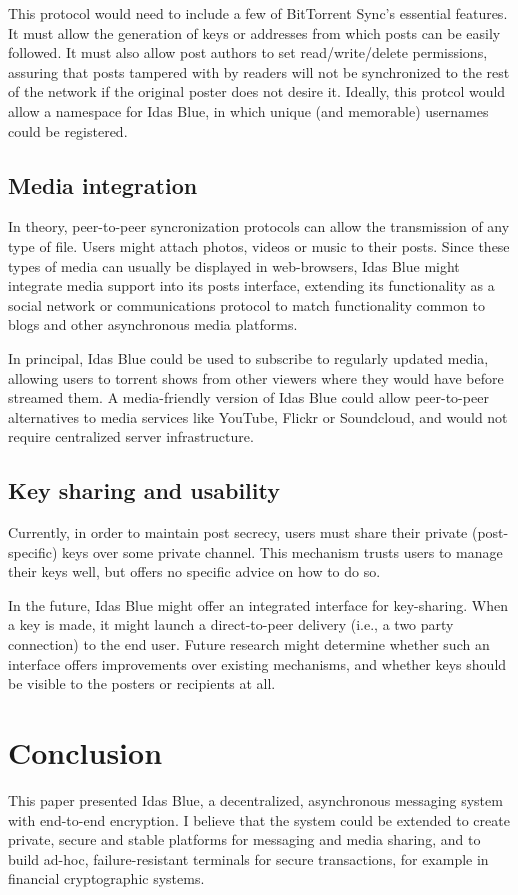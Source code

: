 \documentclass{article}
\begin{document}
This protocol would need to include a few of BitTorrent Sync's essential features. It must allow the generation of keys or addresses from which posts can be easily followed. It must also allow post authors to set read/write/delete permissions, assuring that posts tampered with by readers will not be synchronized to the rest of the network if the original poster does not desire it. Ideally, this protcol would allow a namespace for Idas Blue, in which unique (and memorable) usernames could be registered. 

\subsection{Media integration}
In theory, peer-to-peer syncronization protocols can allow the transmission of any type of file. Users might attach photos, videos or music to their posts. Since these types of media can usually be displayed in web-browsers, Idas Blue might integrate media support into its posts interface, extending its functionality as a social network or communications protocol to match functionality common to blogs and other asynchronous media platforms. 

In principal, Idas Blue could be used to subscribe to regularly updated media, allowing users to torrent shows from other viewers where they would have before streamed them. A media-friendly version of Idas Blue could allow peer-to-peer alternatives to media services like YouTube, Flickr or Soundcloud, and would not require centralized server infrastructure.

\subsection{Key sharing and usability}
Currently, in order to maintain post secrecy, users must share their private (post-specific) keys over some private channel. This mechanism trusts users to manage their keys well, but offers no specific advice on how to do so.

In the future, Idas Blue might offer an integrated interface for key-sharing. When a key is made, it might launch a direct-to-peer delivery (i.e., a two party connection) to the end user. Future research might determine whether such an interface offers improvements over existing mechanisms, and whether keys should be visible to the posters or recipients at all.

\section{Conclusion}
This paper presented Idas Blue, a decentralized, asynchronous messaging system with end-to-end encryption. I believe that the system could be extended to create private, secure and stable platforms for messaging and media sharing, and to build ad-hoc, failure-resistant terminals for secure transactions, for example in financial cryptographic systems.



\end{document}
